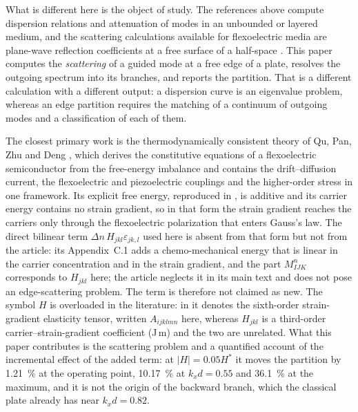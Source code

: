 What is different here is the object of study.  The references above compute
dispersion relations and attenuation of modes in an unbounded or layered
medium, and the scattering calculations available for flexoelectric media are
plane-wave reflection coefficients at a free surface of a half-space
\cite{mondal2022scattering}.  This paper computes the \emph{scattering} of a
guided mode at a free edge of a plate, resolves the outgoing spectrum into its
branches, and reports the partition.  That is a different calculation with a different output: a
dispersion curve is an eigenvalue problem, whereas an edge partition requires
the matching of a continuum of outgoing modes and a classification of each of
them.

The closest primary work is the thermodynamically consistent theory of Qu, Pan, Zhu and Deng \cite{qu2025thermodynamic}, which derives the constitutive equations of a flexoelectric semiconductor from the free-energy imbalance and contains the drift--diffusion current, the flexoelectric and piezoelectric couplings and the higher-order stress in one framework.  Its explicit free energy, reproduced in \cite{hu2025computational}, is additive and its carrier energy contains no strain gradient, so in that form the strain gradient reaches the carriers only through the flexoelectric polarization that enters Gauss's law.  The direct bilinear term $\Delta n\,H_{jkl}\varepsilon_{jk,l}$ used here is absent from that form but not from the article: its Appendix~C.1 adds a chemo-mechanical energy that is linear in the carrier concentration and in the strain gradient, and the part $M^{n}_{IJK}$ corresponds to $H_{jkl}$ here; the article neglects it in its main text and does not pose an edge-scattering problem.  The term is therefore not claimed as new.  The symbol $H$ is overloaded in the literature: in \cite{hu2025computational} it denotes the sixth-order strain-gradient elasticity tensor, written $A_{ijklmn}$ here, whereas $H_{jkl}$ is a third-order carrier--strain-gradient coefficient (J\,m) and the two are unrelated.  What this paper contributes is the scattering problem and a quantified account of the incremental effect of the added term: at $|H|=0.05H^{*}$ it moves the partition by \SI{1.21}{\percent} at the operating point, \SI{10.17}{\percent} at $k_xd=0.55$ and \SI{36.1}{\percent} at the maximum, and it is not the origin of the backward branch, which the classical plate already has near $k_xd=0.82$.
